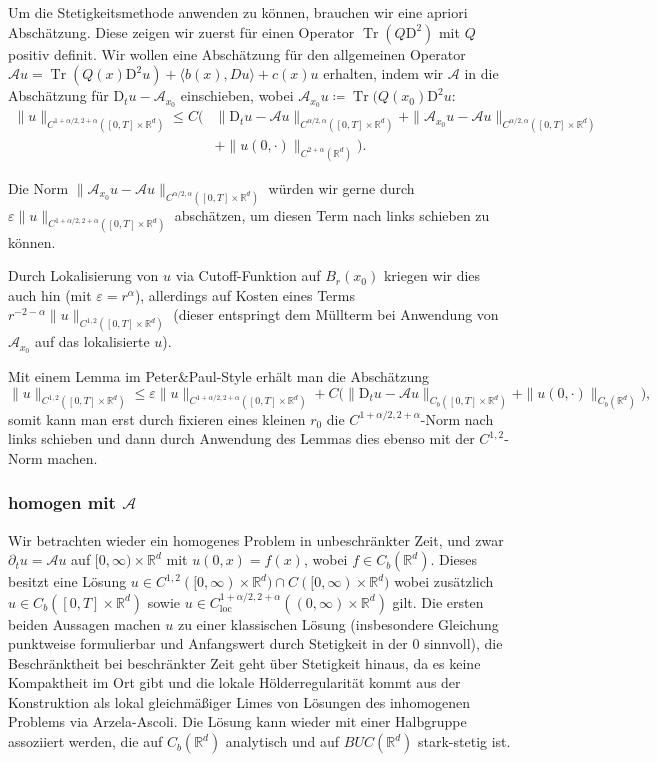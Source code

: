 \documentclass[11pt,a4paper]{scrartcl}
\newcommand{\R}{\mathbb{R}} %
\newcommand{\A}{\mathcal{A}}
\theoremstyle{plain}
\theoremstyle{definition}
\theoremstyle{remark}
\DeclareMathOperator{\Tr}{Tr}
\begin{document}
Um die Stetigkeitsmethode anwenden zu können, brauchen wir eine apriori Abschätzung. Diese zeigen wir zuerst für einen Operator $\Tr(Q\mathrm{D}^2)$ mit $Q$ positiv definit. Wir wollen eine Abschätzung für den allgemeinen Operator $\A u = \Tr(Q(x)\mathrm{D}^2 u) + \langle b(x), Du\rangle + c(x)u$ erhalten, indem wir $\A$ in die Abschätzung für $\mathrm{D}_t u-\A_{x_0}$ einschieben, wobei $\A_{x_0} u\coloneqq \Tr(Q(x_0)\mathrm{D}^2 u$: 
%
\begin{align*}
\|u\|_{C^{1+\alpha/2,2+\alpha}([0,T]\times \R^d)} 
\leq C\big( & \|\mathrm{D}_t u-\A u\|_{C^{\alpha/2,\alpha}([0,T]\times \R^d)} 
+ \|\A_{x_0} u-\A u\|_{C^{\alpha/2,\alpha}([0,T]\times \R^d)} \\
 & 
+ \|u(0,\cdot)\|_{C^{2+\alpha}(\R^d)}
\big).\end{align*}

Die Norm $\|\A_{x_0} u-\A u\|_{C^{\alpha/2,\alpha}([0,T]\times \R^d)}$ würden wir gerne durch $\varepsilon \|u\|_{C^{1+\alpha/2,2+\alpha}([0,T]\times \R^d)}$ abschätzen, um diesen Term nach links schieben zu können.

Durch Lokalisierung von $u$ via Cutoff-Funktion auf $B_r(x_0)$ kriegen wir dies auch hin (mit $\varepsilon=r^\alpha$), allerdings auf Kosten eines Terms $r^{-2-\alpha}\|u\|_{C^{1,2}([0,T]\times \R^d)}$ (dieser entspringt dem Müllterm bei Anwendung von $\A_{x_0}$ auf das lokalisierte $u$).

Mit einem Lemma im Peter\&Paul-Style erhält man die Abschätzung $$\|u\|_{C^{1,2}([0,T]\times \R^d)} \leq \varepsilon \|u\|_{C^{1+\alpha/2,2+\alpha}([0,T]\times \R^d)} + C \big( \|\mathrm{D}_t u-\A u\|_{C_b([0,T]\times \R^d)} + \|u(0,\cdot)\|_{C_b(\R^d)} \big),$$ somit kann man erst durch fixieren eines kleinen $r_0$ die $C^{1+\alpha/2,2+\alpha}$-Norm nach links schieben und dann durch Anwendung des Lemmas dies ebenso mit der $C^{1,2}$-Norm machen.

\subsubsection{homogen mit $\A$}

Wir betrachten wieder ein homogenes Problem in unbeschränkter Zeit, und zwar $\partial_t u = \A u$ auf $[0,\infty)\times \R^d$ mit $u(0,x)=f(x)$, wobei $f\in C_b(\R^d)$. Dieses besitzt eine Lösung $u\in C^{1,2}([0,\infty)\times \R^d) \cap C([0,\infty)\times \R^d)$ wobei zusätzlich $u\in C_b([0,T]\times \R^d)$ sowie $u\in C_\mathrm{loc}^{1+\alpha/2,2+\alpha}((0,\infty)\times \R^d)$ gilt. Die ersten beiden Aussagen machen $u$ zu einer klassischen Lösung (insbesondere Gleichung punktweise formulierbar und Anfangswert durch Stetigkeit in der $0$ sinnvoll), die Beschränktheit bei beschränkter Zeit geht über Stetigkeit hinaus, da es keine Kompaktheit im Ort gibt und die lokale Hölderregularität kommt aus der Konstruktion als lokal gleichmäßiger Limes von Lösungen des inhomogenen Problems via Arzela-Ascoli. Die Lösung kann wieder mit einer Halbgruppe assoziiert werden, die auf $C_b(\R^d)$ analytisch und auf $BUC(\R^d)$ stark-stetig ist.
\end{document}

